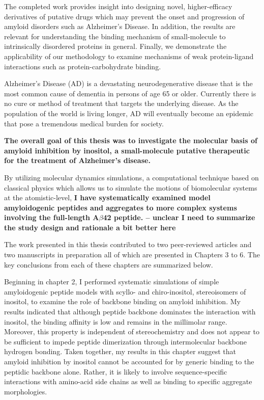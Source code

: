 The completed work provides insight into designing novel, higher-efficacy derivatives of putative drugs which may prevent the onset and progression of amyloid disorders such as Alzheimer's Disease.  In addition, the results are relevant for understanding the binding mechanism of small-molecule to intrinsically disordered proteins in general. Finally, we demonstrate the applicability of our methodology to examine mechanisms of weak protein-ligand interactions such as protein-carbohydrate binding.


Alzheimer's Disease (AD) is a devastating neurodegenerative disease that is the most common cause of dementia in persons of age 65 or older. Currently there is no cure or method of treatment that targets the underlying disease.  As the population of the world is living longer, AD will eventually become an epidemic that pose a tremendous medical burden for society. 

\textbf{The overall goal of this thesis was to investigate the molecular basis of amyloid inhibition by inositol, a small-molecule putative therapeutic for the treatment of Alzheimer's disease.}

By utilizing molecular dynamics simulations, a computational technique based on classical physics which allows us to simulate the motions of biomolecular systems at the atomistic-level, \textbf{I have systematically examined model amyloidogenic peptides and aggregates to more complex systems involving the full-length A$\beta$42 peptide. -- unclear I need to summarize the study design and rationale a bit better here} 

The work presented in this thesis contributed to two peer-reviewed articles and two manuscripts in preparation all of which are presented in Chapters 3 to 6.  The key conclusions from each of these chapters are summarized below.

Beginning in chapter 2, I performed systematic simulations of simple amyloidogenic peptide models with scyllo- and chiro-inositol, stereoisomers of inositol, to examine the role of backbone binding on amyloid inhibition. My results indicated that although peptide backbone dominates the interaction with inositol, the binding affinity is low and remains in the millimolar range. Moreover, this property is independent of stereochemistry and does not appear to be sufficient to impede peptide dimerization through intermolecular backbone hydrogen bonding. Taken together, my results in this chapter suggest that amyloid inhibition by inositol cannot be accounted for by generic binding to the peptidic backbone alone. Rather, it is likely to involve sequence-specific interactions with amino-acid side chains as well as binding to specific aggregate morphologies.

